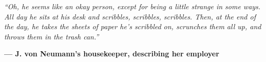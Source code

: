 
\ifPRINTING
\else
\fi


\thispagestyle{empty} %


\vspace*{\fill}
\begin{center}
    \textit{\enquote{Oh, he seems like an okay person, except for being a little strange in some ways. All day he sits at his desk and scribbles, scribbles, scribbles. Then, at the end of the day, he takes the sheets of paper he's scribbled on, scrunches them all up, and throws them in the trash can.}}\\
\end{center}
\begin{flushright}
    \textbf{— J. von Neumann's housekeeper, describing her employer}
\end{flushright}
\vspace*{\fill}

\restoregeometry %
